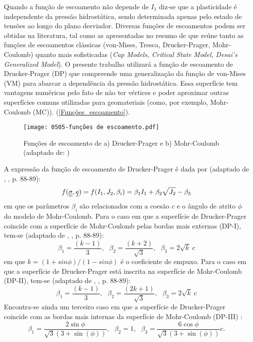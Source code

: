 Quando a função de escoamento não depende de $I_1$   diz-se que a plasticidade é independente da pressão hidrostática, sendo determinada apenas pelo estado de tensões ao longo do plano desviador. Diversas funções de escoamentos podem ser obtidas na literatura, tal como as apresentadas no resumo de  que reúne tanto as funções de escoamentos clássicas (von-Mises, Tresca, Drucker-Prager, Mohr-Coulomb) quanto mais sofisticadas (\textit{Cap Models, Critical State Model, Desai’s Generalized Model}). O presente trabalho utilizará a função de escoamento de Drucker-Prager (DP) que compreende uma generalização da função de von-Mises (VM) para abarcar a dependência da pressão hidrostática. Essa superfície tem vantagens numéricas pelo fato de não ter vértices e poder aproximar outras superfícies comuns utilizadas para geomateriais (como, por exemplo, Mohr-Coulomb (MC)). (\autoref{Funções_escoamento}).
\begin{figure}[H]
	\begin{center}
		\texttt{[image: 0505-funções de escoamento.pdf]}
	\end{center}
	\caption{\label{Funções_escoamento}Funções de escoamento de a) Drucker-Prager e b) Mohr-Coulomb  (adaptado de: )}
\end{figure}
A expressão da função de escoamento de Drucker-Prager é dada por (adaptado de \citeauthor{Bernaud1991}, \citeyear{Bernaud1991}, p. 88-89):
\begin{equation}
	\label{eq:f_Drucker_Prager}
	f(\underline{\underline \sigma},\underline q) = f(I_1,J_2,\beta_i) = \beta_1 I_1 +\beta_2 \sqrt{J_2}-\beta_3
\end{equation}
em que os parâmetros $\beta_i$ são relacionados com a coesão $c$ e o ângulo de atrito $\phi$ do modelo de Mohr-Coulomb. Para o caso em que a superfície de Drucker-Prager coincide com a superfície de Mohr-Coulomb pelas bordas mais externas (DP-I), tem-se (adaptado de \citeauthor{Bernaud1991}, \citeyear{Bernaud1991}, p. 88-89):
\begin{equation}
	\label{eq:f_DP_circunscrita_MC}
	\beta_1 = \dfrac{(k-1)}{3}, ~~~ \beta_2 = \dfrac{(k+2)}{\sqrt{3}}, ~~~
	\beta_3 = 2\sqrt{k}~c
\end{equation}
em que $k = (1+sin{\phi})/(1-sin{\phi})$ é o coeficiente de empuxo. Para o caso em que a superfície de Drucker-Prager está inscrita na superfície de Mohr-Coulomb (DP-II), tem-se (adaptado de \citeauthor{Bernaud1991}, \citeyear{Bernaud1991}, p. 88-89):
\begin{equation}
	\label{eq:f_DP_inscrita_MC}
	\beta_1 = \dfrac{(k-1)}{3}, ~~~ \beta_2 = \dfrac{(2k+1)}{\sqrt{3}}, ~~~
\beta_3 = 2\sqrt{k}~c
\end{equation}
Encontra-se ainda um terceiro caso em que a superfície de Drucker-Prager coincide com as bordas mais internas da superfície de Mohr-Coulomb (DP-III) \cite[p. 167]{Neto2008}:
\begin{equation}
	\label{eq:f_DP_bordainterna_MC}
	\beta_1 = \dfrac{2\sin{\phi}}{\sqrt{3}(3+\sin(\phi))}, ~~~ \beta_2 = 1, ~~~ \beta_3 = \dfrac{6\cos{\phi}}{\sqrt{3}(3+\sin(\phi))}c.
\end{equation}



